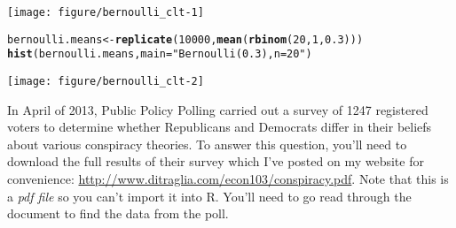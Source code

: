 \documentclass[addpoints,12pt]{exam}\usepackage[]{graphicx}\usepackage[]{color}
\makeatletter
\def\maxwidth{ %
  \ifdim\Gin@nat@width>\linewidth
    \linewidth
  \else
    \Gin@nat@width
  \fi
}
\newcommand{\hlnum}[1]{\textcolor[rgb]{0.686,0.059,0.569}{#1}}%
\newcommand{\hlstr}[1]{\textcolor[rgb]{0.192,0.494,0.8}{#1}}%
\newcommand{\hlopt}[1]{\textcolor[rgb]{0,0,0}{#1}}%
\newcommand{\hlstd}[1]{\textcolor[rgb]{0.345,0.345,0.345}{#1}}%
\newcommand{\hlkwb}[1]{\textcolor[rgb]{0.69,0.353,0.396}{#1}}%
\newcommand{\hlkwc}[1]{\textcolor[rgb]{0.333,0.667,0.333}{#1}}%
\newcommand{\hlkwd}[1]{\textcolor[rgb]{0.737,0.353,0.396}{\textbf{#1}}}%
\newenvironment{kframe}{%
 \def\at@end@of@kframe{}%
 \ifinner\ifhmode%
  \def\at@end@of@kframe{\end{minipage}}%
  \begin{minipage}{\columnwidth}%
 \fi\fi%
 \def\FrameCommand##1{\hskip\@totalleftmargin \hskip-\fboxsep
 \colorbox{shadecolor}{##1}\hskip-\fboxsep
     \hskip-\linewidth \hskip-\@totalleftmargin \hskip\columnwidth}%
 \MakeFramed {\advance\hsize-\width
   \@totalleftmargin\z@ \linewidth\hsize
   \@setminipage}}%
 {\par\unskip\endMakeFramed%
 \at@end@of@kframe}
\newenvironment{knitrout}{}{} %
\makeatother
\begin{document}
\begin{questions}
\begin{solution}
\begin{knitrout}
{\centering \texttt{[image: figure/bernoulli\_clt-1]} 

}


\begin{kframe}\begin{alltt}
\hlstd{bernoulli.means} \hlkwb{<-} \hlkwd{replicate}\hlstd{(}\hlnum{10000}\hlstd{,} \hlkwd{mean}\hlstd{(}\hlkwd{rbinom}\hlstd{(}\hlnum{20}\hlstd{,} \hlnum{1}\hlstd{,} \hlnum{0.3}\hlstd{)))}
\hlkwd{hist}\hlstd{(bernoulli.means,} \hlkwc{main} \hlstd{=} \hlstr{"Bernoulli(0.3), n = 20"}\hlstd{)}
\end{alltt}
\end{kframe}

{\centering \texttt{[image: figure/bernoulli\_clt-2]} 

}



\end{knitrout}
	\end{solution}

\question In April of 2013, Public Policy Polling carried out a survey of 1247 registered voters to determine whether Republicans and Democrats differ in their beliefs about various conspiracy theories. To answer this question, you'll need to download the full results of their survey which I've posted on my website for convenience:
\url{http://www.ditraglia.com/econ103/conspiracy.pdf}. Note that this is a \emph{pdf file} so you can't import it into R. You'll need to go read through the document to find the data from the poll.
\end{questions}
\end{document}
